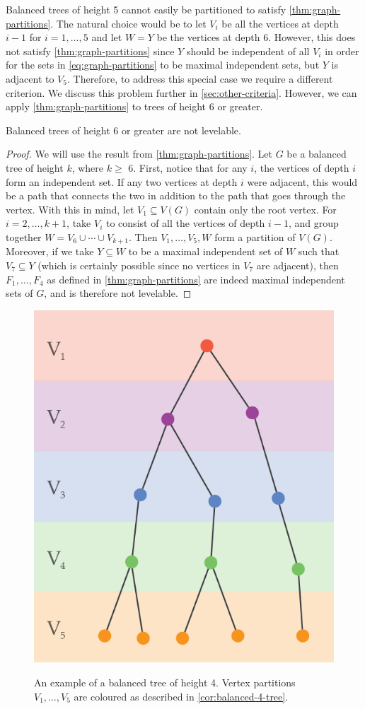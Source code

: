 \begin{remark} Balanced trees of height 5 cannot easily be partitioned to satisfy \autoref{thm:graph-partitions}. The natural choice would be to let $V_i$ be all the vertices at depth $i-1$ for $i = 1, \dots, 5$  and let $W = Y$ be the vertices at depth 6. However, this does not satisfy \autoref{thm:graph-partitions} since $Y$ should be independent of all $V_i$ in order for the sets in \eqref{eq:graph-partitions} to be maximal independent sets, but $Y$ is adjacent to $V_5$. Therefore, to address this special case we require a different criterion. We discuss this problem further in \autoref{sec:other-criteria}. However, we can apply \autoref{thm:graph-partitions} to trees of height 6 or greater.
\end{remark}

\begin{corollary} \label{cor:balanced-trees}
Balanced trees of height 6 or greater are not levelable.
\end{corollary}

\begin{proof}
We will use the result from \autoref{thm:graph-partitions}. Let $G$ be a balanced tree of height $k$, where $k \geq$ 6. First, notice that for any $i$, the vertices of depth $i$ form an independent set. If any two vertices at depth $i$ were adjacent, this would be a path that connects the two in addition to the path that goes through the vertex. With this in mind, let $V_1 \subseteq V(G)$ contain only the root vertex. For $i = 2, \dots, k+1$, take $V_i$ to consist of all the vertices of depth $i-1$, and group together $W = V_6 \cup \cdots \cup V_{k+1}$. Then $V_1, \dots, V_5, W$ form a partition of $V(G)$. Moreover, if we take $Y \subseteq W$ to be a maximal independent set of $W$ such that $V_7 \subseteq Y$ (which is certainly possible since no vertices in $V_7$ are adjacent), then $F_1, \dots, F_4$ as defined in \autoref{thm:graph-partitions} are indeed maximal independent sets of $G$, and is therefore not levelable.
\end{proof}

\begin{figure}[bth]
    \myfloatalign
    {\includegraphics[width=.5\linewidth]{figures/5-tree-colour.png}} 
    \caption{An example of a balanced tree of height 4. Vertex partitions $V_1, \dots, V_5$ are coloured as described in \autoref{cor:balanced-4-tree}.}
\end{figure}

